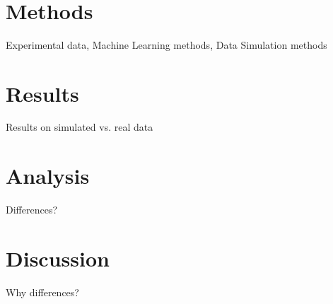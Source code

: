 \\
\section{Methods}

Experimental data, Machine Learning methods, Data Simulation methods
\\
\section{Results}

Results on simulated vs. real data
\\
\section{Analysis}

Differences?
\\
\section{Discussion}

Why differences?




    
    
    
    
    
    
    
    
    
    
  
  